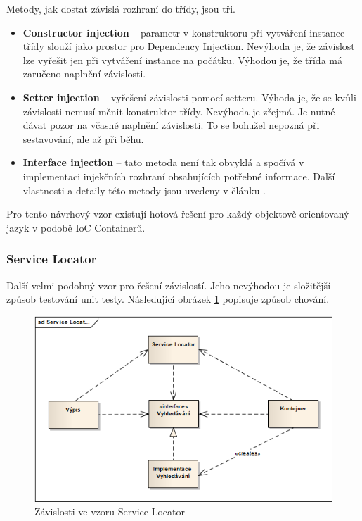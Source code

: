 \documentclass[11pt,twoside,a4paper]{book}
\begin{document}
Metody, jak dostat závislá rozhraní do třídy, jsou tři.

\begin{itemize}
\item \textbf{Constructor injection} -- parametr v konstruktoru při vytváření instance třídy slouží jako prostor pro Dependency Injection. Nevýhoda je, že závislost lze vyřešit jen při vytváření instance na počátku. Výhodou je, že třída má zaručeno naplnění závislosti.
\item \textbf{Setter injection} -- vyřešení závislosti pomocí setteru. Výhoda je, že se kvůli závislosti nemusí měnit konstruktor třídy. Nevýhoda je zřejmá. Je nutné dávat pozor na včasné naplnění závislosti. To se bohužel nepozná při sestavování, ale až při běhu.
\item \textbf{Interface injection} -- tato metoda není tak obvyklá a spočívá v implementaci injekčních rozhraní obsahujících potřebné informace. Další vlastnosti a detaily této metody jsou uvedeny v článku \cite{injection}.
\end{itemize}

Pro tento návrhový vzor existují hotová řešení pro každý objektově orientovaný jazyk v podobě IoC Containerů.

\subsubsection{Service Locator}

Další velmi podobný vzor pro řešení závislostí. Jeho nevýhodou je složitější způsob testování unit testy. Následující obrázek \ref{fig:servicelocator} popisuje způsob chování.

\begin{figure}[h!]
\begin{center}
\includegraphics[scale=0.75]{figures/servicelocator}
\caption{Závislosti ve vzoru Service Locator}
\label{fig:servicelocator}
\end{center}
\end{figure}
\end{document}
